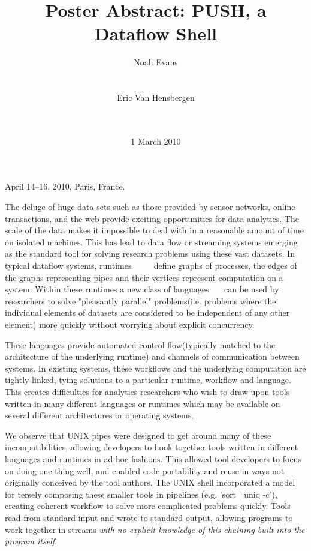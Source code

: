 \documentclass{sig-alt-release2}
\begin{document}
 {April 14--16, 2010, Paris, France.} 
\title{Poster Abstract: PUSH, a Dataflow Shell}

\author{
\alignauthor Noah Evans \\
\\
\\
\alignauthor Eric Van Hensbergen \\
\\
\\
}
\date{1 March 2010}

\maketitle

The deluge of huge data sets such as those provided by sensor
networks, online transactions, and the web provide exciting
opportunities for data analytics.  The scale of the data makes it
impossible to deal with in a reasonable amount of time on isolated
machines.  This has lead to data flow or streaming systems emerging
as the standard tool for solving research problems using these vast
datasets.  In typical dataflow systems,
runtimes~\cite{dean2008msd}~\cite{bialecki:hfr}~\cite{isard2007ddd}
~\cite{streamit} define graphs of processes, the edges of the graphs
representing pipes and their vertices represent computation on a
system.  Within these runtimes a new class of
languages~\cite{pike2005idp}~\cite{yu2008dsg}~\cite{olston2008pln} can
be used by researchers to solve "pleasantly parallel" problems(i.e.
problems where the individual elements of datasets are considered
to be independent of any other element) more quickly without worrying
about explicit concurrency.

These languages provide automated control flow(typically matched
to the architecture of the underlying runtime) and channels of
communication between systems.  In existing systems, these workflows
and the underlying computation are tightly linked, tying solutions
to a particular runtime, workflow and language.  This creates
difficulties for analytics researchers who wish to draw upon tools
written in many different languages or runtimes which may be available
on several different architectures or operating systems.

We observe that UNIX pipes were designed to get around many of these
incompatibilities, allowing developers to hook together tools written
in different languages and runtimes in ad-hoc fashions.  This allowed
tool developers to focus on doing one thing well, and enabled code
portability and reuse in ways not originally conceived by the tool
authors.  The UNIX shell incorporated a model for tersely composing
these smaller tools in pipelines (e.g. 'sort $|$ uniq -c'), creating
coherent workflow to solve more complicated problems quickly.  Tools
read from standard input and wrote to standard output, allowing
programs to work together in streams \emph{with no explicit knowledge
of this chaining built into the program itself}.
\end{document}

